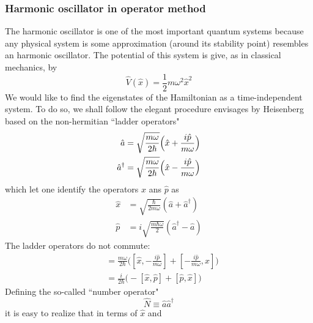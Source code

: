 \subsubsection{Harmonic oscillator in operator method}
The harmonic oscillator is one of the most important quantum
systems because any physical system is some approximation
(around its stability point) resembles an harmonic
oscillator. The potential of this system is give, as in
classical mechanics, by 
\begin{equation}
  \hat{V}(\hat{x}) = \frac{1}{2} m \omega^2 \hat{x}^2
  \label{equ:2.67}
\end{equation}
We would like to find the eigenstates of the Hamiltonian as
a time-independent system. To do so, we shall follow the
elegant procedure envisages by Heisenberg based on the
non-hermitian ``ladder operators"
\begin{subequations}
  \begin{align}
    \hat{a}&=\sqrt{\frac{m\omega}{2\hbar}}\Bigl(\hat{x}+\frac{i\hat{p}}{m\omega}\Bigr)\label{equ:2.68a}\\
    \hat{a}^{\dagger}&=\sqrt{\frac{m\omega}{2\hbar}}\Bigl(\hat{x}-\frac{i\hat{p}}{m\omega}\Bigr)\label{equ:2.68b}
  \end{align}
  \label{equ:2.68}
\end{subequations}
which let one identify the operators $\hat{x}$ ans $\hat{p}$
as
\begin{subequations}
  \begin{align}
    \hat{x} &=
    \sqrt{\frac{\hbar}{2m\omega}}(\hat{a}+\hat{a}^{\dagger})\label{equ:2.69a}\\
    \hat{p} &=
    i\sqrt{\frac{m\hbar \omega}{2}}(\hat{a}^{\dagger}-\hat{a})\label{equ:2.69b}
  \end{align}
\end{subequations}
The ladder operators do not commute:
\begin{align}
  [\hat{a}, \hat{a}^{\dagger}] &= \frac{m\omega}{2\hbar}
  \biggl([\hat{x},-\frac{i\hat{p}}{m\omega}]+[-\frac{i\hat{p}}{m\omega},\hat{x}]\biggr)
  \nonumber\\
  &= \frac{i}{2\hbar}\biggl(
  -[\hat{x},\hat{p}]+[\hat{p},\hat{x}]
  \biggr)\label{equ:2.70}
\end{align}
Defining the so-called ``number operator"
\begin{equation}
  \hat{N} \equiv \hat{a}\hat{a}^{\dagger}
  \label{equ:2.71}
\end{equation}
it is easy to realize that in terms of $\hat{x}$ and
